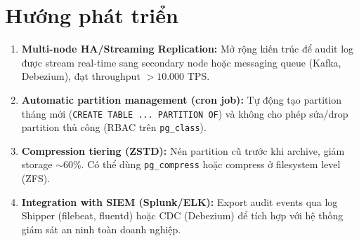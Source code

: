 \section{Hướng phát triển}

\begin{sloppypar}
\begin{enumerate}
    \item \textbf{Multi-node HA/Streaming Replication:} Mở rộng kiến trúc để audit log được stream real-time sang secondary node hoặc messaging queue (Kafka, Debezium), đạt throughput $> 10.000$ TPS.

    \item \textbf{Automatic partition management (cron job):} Tự động tạo partition tháng mới (\texttt{CREATE TABLE ... PARTITION OF}) và không cho phép sửa/drop partition thủ công (RBAC trên \texttt{pg\_class}).

    \item \textbf{Compression tiering (ZSTD):} Nén partition cũ trước khi archive, giảm storage $\sim$60\%. Có thể dùng \texttt{pg\_compress} hoặc compress ở filesystem level (ZFS).

    \item \textbf{Integration with SIEM (Splunk/ELK):} Export audit events qua log Shipper (filebeat, fluentd) hoặc CDC (Debezium) để tích hợp với hệ thống giám sát an ninh toàn doanh nghiệp.
\end{enumerate}
\end{sloppypar}
